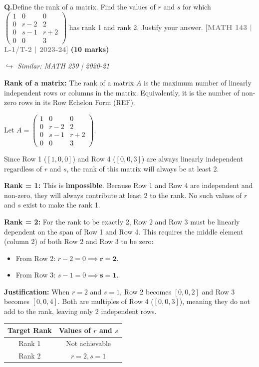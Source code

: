 \documentclass[12pt,a3paper]{article}
\newcommand{\yr}[1]{\hfill\textcolor{gray}{\small\textbf{[#1]}}}
\newcommand{\mk}[1]{\textcolor{orange!70!black}{\small\textbf{(#1 marks)}}}
\newcommand{\variant}[1]{\par\vspace{1pt}\textcolor{blue!50!black}%
  {\footnotesize\textit{$\hookrightarrow$ Similar: #1}}}
\newcounter{qnum}
\newcommand{\Q}[1]{%
  \needspace{4\baselineskip}
  \refstepcounter{qnum}
  \vspace{6pt}
  \noindent\textbf{Q\theqnum.}\enspace #1\par
}
\begin{document}
\Q{Define the rank of a matrix. Find the values of $r$ and $s$ for which
$\begin{pmatrix} 1 & 0 & 0 \\ 0 & r-2 & 2 \\ 0 & s-1 & r+2 \\ 0 & 0 & 3 \end{pmatrix}$
has rank 1 and rank 2. Justify your answer.
\yr{MATH 143 | L-1/T-2 | 2023-24} \mk{10}
\variant{MATH 259 | 2020-21}}

\begin{tcolorbox}[enhanced,breakable,
  colback=cB!4,colframe=cB,boxrule=0.8pt,arc=5pt,
  title={\textbf{Answer --- Rank Definition; Values of $r,s$ for Given Ranks}},
  fonttitle=\bfseries\color{white},colbacktitle=cB]

\textbf{Rank of a matrix:} The rank of a matrix $A$ is the maximum number of linearly independent rows or columns in the matrix. Equivalently, it is the number of non-zero rows in its Row Echelon Form (REF).

\medskip
Let $A = \begin{pmatrix} 1 & 0 & 0 \\ 0 & r-2 & 2 \\ 0 & s-1 & r+2 \\ 0 & 0 & 3 \end{pmatrix}$.

Since Row 1 ($[1, 0, 0]$) and Row 4 ($[0, 0, 3]$) are always linearly independent regardless of $r$ and $s$, the rank of this matrix will always be at least 2.

\textbf{Rank = 1:} This is \textbf{impossible}. Because Row 1 and Row 4 are independent and non-zero, they will always contribute at least 2 to the rank. No such values of $r$ and $s$ exist to make the rank 1.

\textbf{Rank = 2:} For the rank to be exactly 2, Row 2 and Row 3 must be linearly dependent on the span of Row 1 and Row 4. This requires the middle element (column 2) of both Row 2 and Row 3 to be zero:
\begin{itemize}
    \item From Row 2: $r - 2 = 0 \implies \mathbf{r = 2}$.
    \item From Row 3: $s - 1 = 0 \implies \mathbf{s = 1}$.
\end{itemize}

\textbf{Justification:} When $r=2$ and $s=1$, Row 2 becomes $[0, 0, 2]$ and Row 3 becomes $[0, 0, 4]$. Both are multiples of Row 4 ($[0, 0, 3]$), meaning they do not add to the rank, leaving only 2 independent rows.

\begin{center}
\small
\begin{tabular}{@{}cc@{}}
\toprule
\textbf{Target Rank} & \textbf{Values of $r$ and $s$} \\
\midrule
Rank 1 & Not achievable \\
Rank 2 & $r = 2, s = 1$ \\
\bottomrule
\end{tabular}
\end{center}

\end{tcolorbox}
\end{document}
